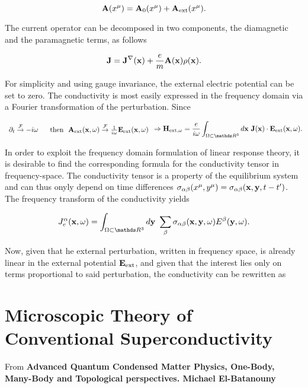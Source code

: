 \documentclass{homework}
\begin{document}
$$
   {\bf A}(x^{\mu}) = {\bf A}_{0}(x^{\mu}) +  {\bf A}_{\textnormal{ext}}(x^{\mu}).
$$

The current operator can be decomposed in two components, the diamagnetic and the paramagnetic terms, as follows 

\begin{equation}
    {\bf J} = {\bf J}^{\nabla}({\bf x}) + \frac{e}{m} {\bf A}({\bf x}) \rho({\bf x}).  
\end{equation}

For simplicity and using gauge invariance, the external electric potential can be set to zero. The conductivity is most easily expressed in the frequency domain via a Fourier transformation of the perturbation. Since 

\begin{equation} \begin{array}{cc}
     \partial_t \overset{\mathcal{F}}{\rightarrow} -i\omega \blanky & \textnormal{ then } \blanky {\bf A}_{\textnormal{ext}}({\bf x}, \omega) \overset{\mathcal{F}}{\rightarrow}  \frac{1}{i\omega} {\bf E}_{\textnormal{ext}}({\bf x}, \omega) \\
\end{array}
     \Rightarrow \Hamiltonian_{\textnormal{ext}, \omega} = \frac{e}{i\omega} \int_{\Omega \subset \R^3} d{\bf x} \blanky {\bf J}({\bf x}) \cdot {\bf E}_{\textnormal{ext}}({\bf x}, \omega).
\end{equation}

In order to exploit the frequency domain formulation of linear response theory, it is desirable to find the corresponding formula for the conductivity tensor in frequency-space. The conductivity tensor is a property of the equilibrium system and can thus onyly depend on time differences $ \sigma_{\alpha \beta}(x^\mu, y^{\mu}) =  \sigma_{\alpha \beta}({\bf x},{\bf y}, t-t')$. The frequency transform of the conductivity yields

\begin{equation}
    J^{\alpha}_{e}({\bf x}, \omega) = \int_{\Omega \subset \R^3 } d{\bf y} \blanky \sum_{ \beta} \sigma_{\alpha \beta}({\bf x},{\bf y}, \omega) E^{\beta}({\bf y}, \omega).
\end{equation}

Now, given that he external perturbation, written in frequency space, is already linear in the external potential ${\bf E}_{\textnormal{ext}}$, and given that the interest lies only on terms proportional to said perturbation, the conductivity can be rewritten as 

\clearpage

\section{Microscopic Theory of Conventional Superconductivity}

From \textbf{Advanced Quantum Condensed Matter Physics, One-Body, Many-Body and Topological perspectives. Michael El-Batanouny} \\

\paragraph{\textbf{}}
\end{document}
